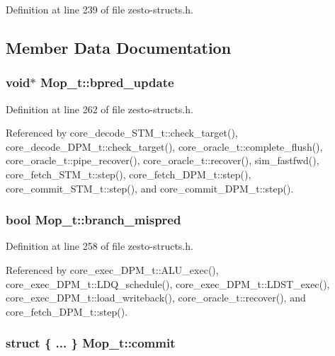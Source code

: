 Definition at line 239 of file zesto-structs.h.

\subsection{Member Data Documentation}
\subsubsection[{bpred\_\-update}]{\setlength{\rightskip}{0pt plus 5cm}void$\ast$ {\bf Mop\_\-t::bpred\_\-update}}\label{structMop__t_f33535affa9efa0509db7e31a70bea08}




Definition at line 262 of file zesto-structs.h.

Referenced by core\_\-decode\_\-STM\_\-t::check\_\-target(), core\_\-decode\_\-DPM\_\-t::check\_\-target(), core\_\-oracle\_\-t::complete\_\-flush(), core\_\-oracle\_\-t::pipe\_\-recover(), core\_\-oracle\_\-t::recover(), sim\_\-fastfwd(), core\_\-fetch\_\-STM\_\-t::step(), core\_\-fetch\_\-DPM\_\-t::step(), core\_\-commit\_\-STM\_\-t::step(), and core\_\-commit\_\-DPM\_\-t::step().
\subsubsection[{branch\_\-mispred}]{\setlength{\rightskip}{0pt plus 5cm}bool {\bf Mop\_\-t::branch\_\-mispred}}\label{structMop__t_b816a0b34ea5ca8a061c02c6946fef3e}




Definition at line 258 of file zesto-structs.h.

Referenced by core\_\-exec\_\-DPM\_\-t::ALU\_\-exec(), core\_\-exec\_\-DPM\_\-t::LDQ\_\-schedule(), core\_\-exec\_\-DPM\_\-t::LDST\_\-exec(), core\_\-exec\_\-DPM\_\-t::load\_\-writeback(), core\_\-oracle\_\-t::recover(), and core\_\-fetch\_\-DPM\_\-t::step().
\subsubsection[{commit}]{\setlength{\rightskip}{0pt plus 5cm}struct \{ ... \}   {\bf Mop\_\-t::commit}}\label{structMop__t_77cff2eda77d17e84d903d3dedd6d0af}





